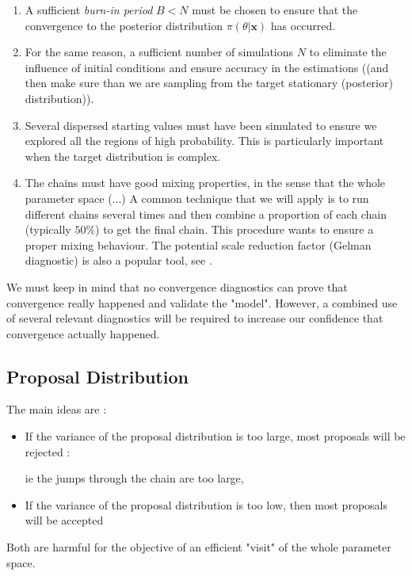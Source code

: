 \begin{enumerate}
	\item A sufficient \emph{burn-in period} $B<N$ must be chosen to ensure that the convergence to the posterior distribution $\pi(\theta|\boldsymbol{x})$ has occurred. 
	\item For the same reason, a sufficient number of simulations $N$ to eliminate the influence of initial conditions and ensure accuracy in the estimations ((and then make sure than we are sampling from the target stationary (posterior) distribution)).
	\item Several dispersed starting values must have been simulated to ensure we explored all the regions of high probability. This is particularly important when the target distribution is complex.
	\item\label{convdiag4} The chains must have good mixing properties, in the sense that the whole parameter space (...) 
	A common technique that we will apply is to run different chains several times and then combine a proportion of each chain (typically $50\%$) to get the final chain. This procedure wants to ensure a proper mixing behaviour. 
	The potential scale reduction factor (Gelman diagnostic) is also a popular tool, see .
\end{enumerate}

We must keep in mind that no convergence diagnostics can prove that convergence really happened and validate the "model".
However, a combined use of several relevant diagnostics will be required to increase our confidence that convergence actually happened.

\subsection{Proposal Distribution}



The main ideas are : 

\begin{itemize}
	\item If the variance of the proposal distribution is too large, most proposals will be rejected : 
	
	 ie the jumps through the chain are too large,
	\item If the variance of the proposal distribution is too low, then most proposals will be accepted
\end{itemize}

Both are harmful for the objective of an efficient "visit" of the whole parameter space. 


